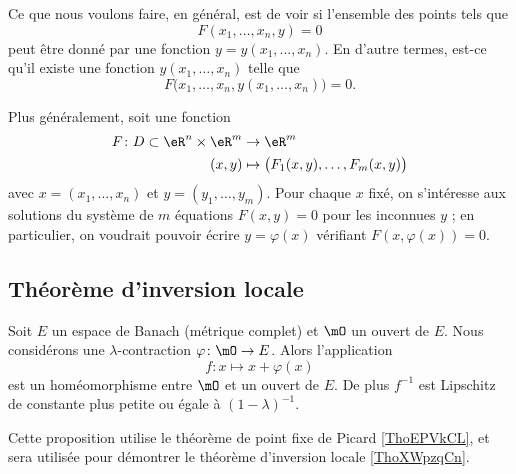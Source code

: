 Ce que nous voulons faire, en général, est de voir si l'ensemble des points tels que
\begin{equation}
    F(x_1,\ldots,x_n,y)=0
\end{equation}
peut être donné par une fonction $y=y(x_1,\ldots,x_n)$. En d'autre termes, est-ce qu'il existe une fonction $y(x_1,\ldots,x_n)$ telle que
\begin{equation}
    F\big( x_1,\ldots,x_n,y(x_1,\ldots,x_n)\big)=0.
\end{equation}

Plus généralement, soit une fonction
\begin{equation}
    \begin{aligned}
        F\colon D\subset \eR^n\times \eR^m&\to \eR^m \\
        (x,y)&\mapsto \big( F_1(x,y),\ldots, F_m(x,y) \big) 
    \end{aligned}
\end{equation}
avec $x = (x_1,\ldots, x_n)$ et $y = (y_1,\ldots,y_m)$. Pour chaque $x$ fixé, on s'intéresse aux solutions du système de $m$ équations $F(x,y) = 0$ pour les inconnues $y$ ; en particulier, on voudrait pouvoir écrire $y = \varphi(x)$ vérifiant $F(x,\varphi(x)) = 0$.

\subsection{Théorème d'inversion locale}

\begin{lemma} \label{LemGZoqknC}
    Soit \( E\) un espace de Banach (métrique complet) et \( \mO\) un ouvert de \( E\). Nous considérons une \( \lambda\)-contraction \( \varphi\colon \mO\to E\). Alors l'application
    \begin{equation}
    f\colon x\mapsto x+\varphi(x)
    \end{equation}
    est un homéomorphisme entre \( \mO\) et un ouvert de \( E\). De plus \( f^{-1}\) est Lipschitz de constante plus petite ou égale à \( (1-\lambda)^{-1}\).
\end{lemma}
Cette proposition utilise le théorème de point fixe de Picard \ref{ThoEPVkCL},
et sera utilisée pour démontrer le théorème d'inversion locale \ref{ThoXWpzqCn}.

